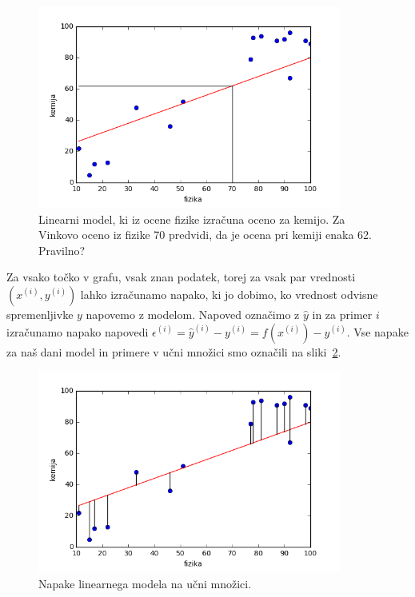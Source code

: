 \begin{figure}[htbp]
\begin{center}
\includegraphics[width=10cm]{slike/fiz-kem-priblizno.png}
\caption{Linearni model, ki iz ocene fizike izračuna oceno za
  kemijo. Za Vinkovo oceno iz fizike 70 predvidi, da je ocena pri
  kemiji enaka 62. Pravilno?}
\label{f:fiz-kem-priblizno}
\end{center}
\end{figure}

Za vsako točko v grafu, vsak znan podatek, torej za vsak par vrednosti
$(x^{(i)},y^{(i)})$ lahko izračunamo napako, ki jo dobimo, ko vrednost odvisne
spremenljivke $y$ napovemo z modelom. Napoved označimo z $\hat{y}$ in
za primer $i$ izračunamo napako napovedi
$\epsilon^{(i)}=\hat{y}^{(i)}-y^{(i)}=f(x^{(i)})-y^{(i)}$. Vse napake za naš dani model in
primere v učni množici smo označili na sliki~\ref{f:fiz-kem-eps}.

\begin{figure}[htbp]
\begin{center}
\includegraphics[width=10cm]{slike/fiz-kem-eps.png}
\caption{Napake linearnega modela na učni množici.}
\label{f:fiz-kem-eps}
\end{center}
\end{figure}

